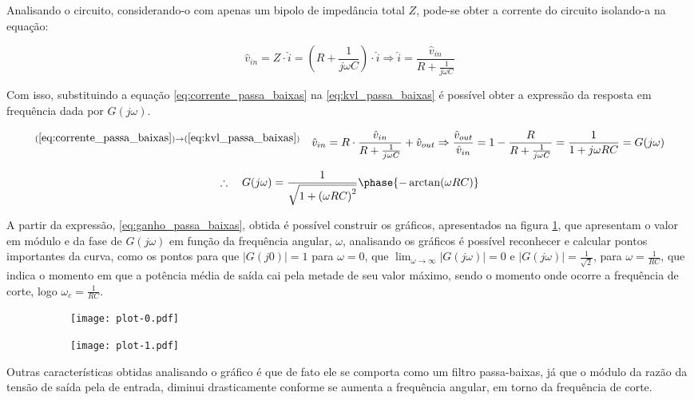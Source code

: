   Analisando o circuito, considerando-o com apenas um bipolo de impedância total $Z$, pode-se obter a corrente do circuito isolando-a na equação:

  \begin{equation}
    \hat{v}_{in} = Z \cdot \hat{i} = \left( R + \frac{1}{j \omega C} \right) \cdot \hat{i} \Rightarrow \hat{i} = \frac{\hat{v}_{in}}{R + \frac{1}{j \omega C}}
    \label{eq:corrente_passa_baixas}
  \end{equation}

  Com isso, substituindo a equação \ref{eq:corrente_passa_baixas} na \ref{eq:kvl_passa_baixas} é possível obter a expressão da resposta em frequência dada por $G(j \omega)$.

  \begin{equation*}
    \sp{(\ref{eq:corrente_passa_baixas}) \rightarrow (\ref{eq:kvl_passa_baixas})}
    \quad \hat{v}_{in} = R \cdot \frac{\hat{v}_{in}}{R + \frac{1}{j \omega C}} + \hat{v}_{out} \Rightarrow \frac{\hat{v}_{out}}{\hat{v}_{in}} = 1 - \frac{R}{R + \frac{1}{j \omega C}} = \frac{1}{1 + j \omega R C} = G(j \omega) 
  \end{equation*}

  \begin{equation}
    \therefore \quad G(j \omega) = \frac{1}{\sqrt{1 + \left(\omega R C\right)^2}} \phase{-\arctan(\omega R C)}
    \label{eq:ganho_passa_baixas}
  \end{equation}

  A partir da expressão, \ref{eq:ganho_passa_baixas}, obtida é possível construir os gráficos, apresentados na figura \ref{fig:grafico_passa_baixas}, que apresentam o valor em módulo e da fase de $G(j\omega)$ em função da frequência angular, $\omega$, analisando os gráficos é possível reconhecer e calcular pontos importantes da curva, como os pontos para que $|G(j0)| = 1$ para $\omega = 0$, que $ \lim_{\omega\to\infty} |G(j\omega)| = 0$ e $|G(j \omega)| = \frac{1}{\sqrt{2}}$, para $\omega = \frac{1}{RC}$, que indica o momento em que a potência média de saída cai pela metade de seu valor máximo, sendo o momento onde ocorre a frequência de corte, logo $\omega_c = \frac{1}{RC}$.

  \begin{figure}[H]
    \centering
    \caption{Gráficos do circuito passa-baixas, módulo e fase, respectivamente}
    \begin{subfigure}{0.5 \linewidth}
      \texttt{[image: plot-0.pdf]}
    \end{subfigure}%
    \begin{subfigure}{0.5 \linewidth}
      \texttt{[image: plot-1.pdf]}
    \end{subfigure}
    \label{fig:grafico_passa_baixas}
  \end{figure}

  Outras características obtidas analisando o gráfico é que de fato ele se comporta como um filtro passa-baixas, já que o módulo da razão da tensão de saída pela de entrada, diminui drasticamente conforme se aumenta a frequência angular, em torno da frequência de corte.
  